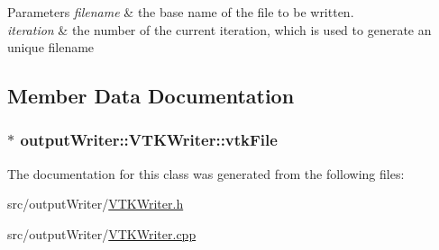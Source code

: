 \begin{DoxyParams}{Parameters}
{\em filename} & the base name of the file to be written. \\
\hline
{\em iteration} & the number of the current iteration, which is used to generate an unique filename \\
\hline
\end{DoxyParams}


\subsection{Member Data Documentation}
\hypertarget{classoutputWriter_1_1VTKWriter_ab654ea4308b92e5dbdcd9a6833d5ed30}{
\subsubsection[{vtk\-File}]{$\ast$ output\-Writer\-::\-V\-T\-K\-Writer\-::vtk\-File\hspace{0.3cm}{\ttfamily [private]}}}\label{classoutputWriter_1_1VTKWriter_ab654ea4308b92e5dbdcd9a6833d5ed30}


The documentation for this class was generated from the following files\-:\begin{DoxyCompactItemize}
\item 
src/output\-Writer/\hyperlink{VTKWriter_8h}{V\-T\-K\-Writer.\-h}\item 
src/output\-Writer/\hyperlink{VTKWriter_8cpp}{V\-T\-K\-Writer.\-cpp}\end{DoxyCompactItemize}
